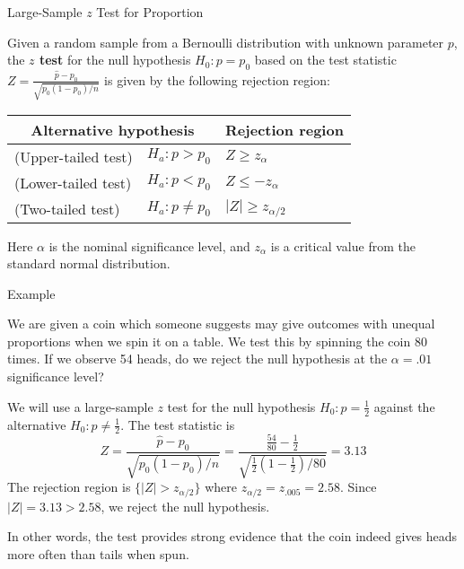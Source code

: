 \documentclass[handout]{beamer}
\renewcommand{\emph}{\textbf}
\begin{document}
\begin{frame}{Large-Sample $z$ Test for Proportion}
\begin{block}{}
Given a random sample from a Bernoulli distribution with unknown parameter $p$, the \emph{$z$ test} for the null hypothesis $H_0: p=p_0$ based on the test statistic $Z=\frac{\hat p-p_0}{\sqrt{p_0(1-p_0)/n}}$ is given by the following rejection region:
\begin{center}
\begin{tabular}{ll|l}
\multicolumn{2}{c}{Alternative hypothesis} & Rejection region \\ \hline
(Upper-tailed test) & $H_a: p>p_0$ & $Z\geq z_{\alpha}$ \\
(Lower-tailed test) & $H_a: p<p_0$ & $Z\leq -z_{\alpha}$ \\
(Two-tailed test) & $H_a: p\neq p_0$ & $|Z|\geq z_{\alpha/2}$\\
\end{tabular}
\end{center}
Here $\alpha$ is the nominal significance level, and $z_{\alpha}$ is a critical value from the standard normal distribution.
\end{block}
\end{frame}

\begin{frame}{Example}
\begin{block}{}
We are given a coin which someone suggests may give outcomes with unequal proportions when we spin it on a table. We test this by spinning the coin 80 times. If we observe 54 heads, do we reject the null hypothesis at the $\alpha=.01$ significance level?
\end{block}
\pause We will use a large-sample $z$ test for the null hypothesis $H_0: p=\frac12$ against the alternative $H_0: p\neq\frac12$. \pause The test statistic is
$$Z=\frac{\hat p-p_0}{\sqrt{p_0(1-p_0)/n}}=\frac{\frac{54}{80}-\frac12}{\sqrt{\frac12(1-\frac12)/80}}=3.13$$
\pause The rejection region is $\{|Z|>z_{\alpha/2}\}$ where $z_{\alpha/2}=z_{.005}=2.58$. \pause Since $|Z|=3.13>2.58$, we reject the null hypothesis. 

\vspace{.2cm}
\pause In other words, the test provides strong evidence that the coin indeed gives heads more often than tails when spun.
\end{frame}
\end{document}

